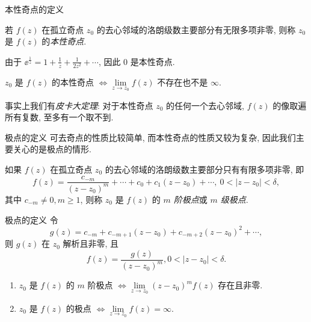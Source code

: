 \begin{frame}{本性奇点的定义}
	\onslide<+->
	\begin{definition}
		若 $f(z)$ 在孤立奇点 $z_0$ 的去心邻域的洛朗级数主要部分有无限多项非零, 则称 $z_0$ 是 $f(z)$ 的\emph{本性奇点}.
	\end{definition}

	\onslide<+->
	\begin{example}
		由于 $\displaystyle \ee^{\frac1z}=1+\frac1z+\frac1{2z^2}+\cdots$, 因此 $0$ 是本性奇点.
	\end{example}

	\onslide<+->
	\begin{theorem}
		$z_0$ 是 $f(z)$ 的本性奇点 $\iff\lim\limits_{z\to z_0}f(z)$ 不存在也不是 $\infty$.
	\end{theorem}

	\onslide<+->
	事实上我们有\emph{皮卡大定理}: 对于本性奇点 $z_0$ 的任何一个去心邻域, $f(z)$ 的像取遍所有复数, 至多有一个取不到.
\end{frame}


\begin{frame}{极点的定义}
	\onslide<+->
	可去奇点的性质比较简单, 而本性奇点的性质又较为复杂, 因此我们主要关心的是极点的情形.

	\onslide<+->
	\begin{definition}
		如果 $f(z)$ 在孤立奇点 $z_0$ 的去心邻域的洛朗级数主要部分只有有限多项非零, 即
	\[
		f(z)=\frac{c_{-m}}{(z-z_0)^m}+\cdots+c_0+c_1(z-z_0)+\cdots,\ 0<|z-z_0|<\delta,
	\]
		其中 $c_{-m}\neq 0,m\ge 1$, 则称 $z_0$ 是 $f(z)$ 的 \emph{$m$ 阶极点}或 \emph{$m$ 级极点}.
	\end{definition}
\end{frame}


\begin{frame}{极点的定义}
	\onslide<+->
	令
	\[g(z)=c_{-m}+c_{-m+1}(z-z_0)+c_{-m+2}(z-z_0)^2+\cdots,
	\]
	则 $g(z)$ 在 $z_0$ 解析且非零,
	\onslide<+->
	且
	\[f(z)=\dfrac{g(z)}{(z-z_0)^m},0<|z-z_0|<\delta.
	\]

	\onslide<+->
	\begin{theorem}
		\begin{enumerate}
			\item $z_0$ 是 $f(z)$ 的 $m$ 阶极点 $\iff\lim\limits_{z\to z_0}(z-z_0)^mf(z)$ 存在且非零.
			\item $z_0$ 是 $f(z)$ 的极点 $\iff\lim\limits_{z\to z_0}f(z)=\infty$.
		\end{enumerate}
	\end{theorem}
\end{frame}


